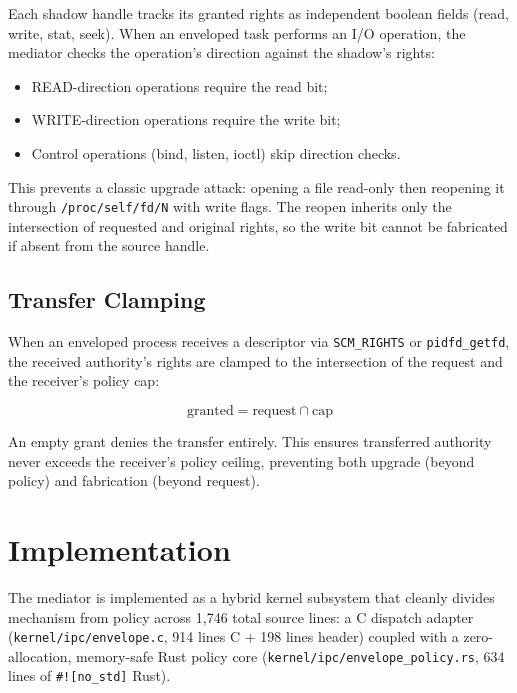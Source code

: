 \documentclass[letterpaper,twocolumn,10pt]{article}
\begin{document}
Each shadow handle tracks its granted rights as independent boolean
fields (read, write, stat, seek).  When an enveloped task performs an
I/O operation, the mediator checks the operation's direction against
the shadow's rights:

\begin{itemize}
\item READ-direction operations require the read bit;
\item WRITE-direction operations require the write bit;
\item Control operations (bind, listen, ioctl) skip direction checks.
\end{itemize}

This prevents a classic upgrade attack: opening a file read-only then
reopening it through \texttt{/proc/self/fd/N} with write flags.  The
reopen inherits only the intersection of requested and original rights,
so the write bit cannot be fabricated if absent from the source handle.

\subsection{Transfer Clamping}

When an enveloped process receives a descriptor via
\texttt{SCM\_RIGHTS} or \texttt{pidfd\_getfd}, the received authority's
rights are clamped to the intersection of the request and the
receiver's policy cap:

\[
  \text{granted} = \text{request} \cap \text{cap}
\]

An empty grant denies the transfer entirely.  This ensures transferred
authority never exceeds the receiver's policy ceiling, preventing both
upgrade (beyond policy) and fabrication (beyond request).

\section{Implementation}
\label{sec:impl}

The mediator is implemented as a hybrid kernel subsystem that cleanly divides
mechanism from policy across 1{,}746 total source lines: a C dispatch adapter
(\texttt{kernel/ipc/envelope.c}, 914 lines C + 198 lines header) coupled with a
zero-allocation, memory-safe Rust policy core (\texttt{kernel/ipc/envelope\_policy.rs},
634 lines of \texttt{\#![no\_std]} Rust).
\end{document}
